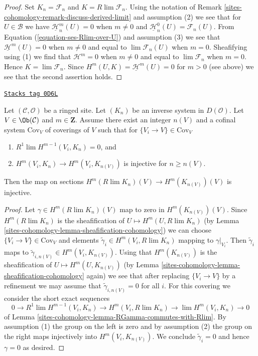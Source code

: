 \begin{proof}
Set $K_n = \mathcal{F}_n$ and $K = R\lim \mathcal{F}_n$. Using the notation
of Remark \ref{sites-cohomology-remark-discuss-derived-limit} and assumption (2) we see that for
$U \in \mathcal{B}$ we have $\underline{\mathcal{H}}_n^m(U) = 0$
when $m \not = 0$ and $\underline{\mathcal{H}}_n^0(U) = \mathcal{F}_n(U)$.
From Equation (\ref{equation-ses-Rlim-over-U}) and assumption (3)
we see that $\underline{\mathcal{H}}^m(U) = 0$
when $m \not = 0$ and equal to $\lim \mathcal{F}_n(U)$
when $m = 0$. Sheafifying using (1) we find that
$\mathcal{H}^m = 0$ when $m \not = 0$ and equal to
$\lim \mathcal{F}_n$ when $m = 0$.
Hence $K = \lim \mathcal{F}_n$.
Since $H^m(U, K) = \underline{\mathcal{H}}^m(U) = 0$ for $m > 0$
(see above) we see that the second assertion holds.
\end{proof}

\begin{lemma}
\label{sites-cohomology-lemma-cohomology-derived-limit-injective}
\href{https://stacks.math.columbia.edu/tag/0D6L}{\texttt{Stacks tag 0D6L}}

Let $(\mathcal{C}, \mathcal{O})$ be a ringed site. Let $(K_n)$ be an
inverse system in $D(\mathcal{O})$. Let $V \in \Ob(\mathcal{C})$
and $m \in \mathbf{Z}$. Assume there exist an integer $n(V)$
and a cofinal system $\text{Cov}_V$ of coverings of $V$ such that
for $\{V_i \to V\} \in \text{Cov}_V$
\begin{enumerate}
\item $R^1\lim H^{m - 1}(V_i, K_n) = 0$, and
\item $H^m(V_i, K_n) \to H^m(V_i, K_{n(V)})$ is injective
for $n \geq n(V)$.
\end{enumerate}
Then the map on sections $H^m(R\lim K_n)(V) \to H^m(K_{n(V)})(V)$ is injective.
\end{lemma}

\begin{proof}
Let $\gamma \in H^m(R\lim K_n)(V)$ map to zero in
$H^m(K_{n(V)})(V)$. Since $H^m(R\lim K_n)$ is the sheafification of
$U \mapsto H^m(U, R\lim K_n)$ (by Lemma \ref{sites-cohomology-lemma-sheafification-cohomology})
we can choose $\{V_i \to V\} \in \text{Cov}_V$
and elements $\tilde\gamma_i \in H^m(V_i, R\lim K_n)$ mapping to
$\gamma|_{V_i}$.
Then $\tilde\gamma_i$ maps to $\tilde\gamma_{i, n(V)} \in H^m(V_i, K_{n(V)})$.
Using that $H^m(K_{n(V)})$ is the sheafification of
$U \mapsto H^m(U, K_{n(V)})$
(by Lemma \ref{sites-cohomology-lemma-sheafification-cohomology} again)
we see that after replacing $\{V_i \to V\}$ by a refinement
we may assume that $\tilde\gamma_{i, n(V)} = 0$ for all $i$.
For this covering we consider the short exact sequences
$$
0 \to
R^1\lim H^{m - 1}(V_i, K_n) \to H^m(V_i, R\lim K_n) \to
\lim H^m(V_i, K_n) \to 0
$$
of Lemma \ref{sites-cohomology-lemma-RGamma-commutes-with-Rlim}.
By assumption (1) the group on the left is zero and by
assumption (2) the group on the right maps injectively
into $H^m(V_i, K_{n(V)})$. We conclude $\tilde\gamma_i = 0$
and hence $\gamma = 0$ as desired.
\end{proof}


